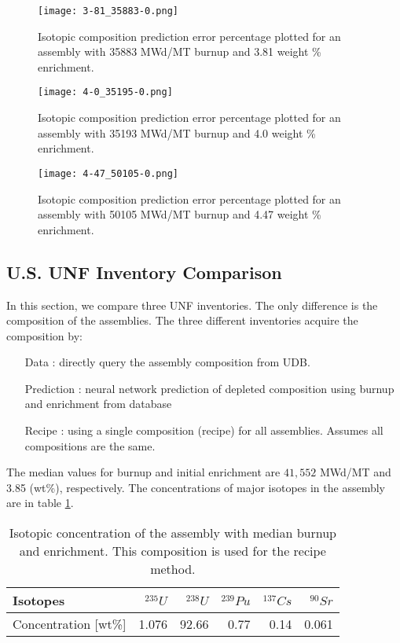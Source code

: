 \begin{figure}
    \centering
    \texttt{[image: 3-81\_35883-0.png]}
    \caption{Isotopic composition prediction error percentage
             plotted for an assembly with 
             35883 MWd/MT burnup and 3.81 weight \% enrichment.}
    \label{fig:3-81_35883-0}
\end{figure}

\begin{figure}
    \centering
    \texttt{[image: 4-0\_35195-0.png]}
    \caption{Isotopic composition prediction error percentage
             plotted for an assembly with 
             35193 MWd/MT burnup and 4.0 weight \% enrichment.}
    \label{fig:4-0_35195-0}
\end{figure}


\begin{figure}
    \centering
    \texttt{[image: 4-47\_50105-0.png]}
    \caption{Isotopic composition prediction error percentage
             plotted for an assembly with 
             50105 MWd/MT burnup and 4.47 weight \% enrichment.}
    \label{fig:4-47_50105-0}
\end{figure}

\FloatBarrier

\subsection{U.S. \gls{UNF} Inventory Comparison}

In this section, we compare three \gls{UNF} inventories.
The only difference is the composition of the
assemblies. The three different inventories acquire the composition by:

\begin{enumerate}
    \item [Data]: directly query the assembly composition from \gls{UDB}.
    \item [Prediction]: neural network prediction of depleted composition using burnup and enrichment from database
    \item [Recipe]: using a single composition (recipe) for all assemblies. Assumes all compositions are the same.
\end{enumerate}

The median values for burnup and initial enrichment are
$41,552$ MWd/MT and 3.85 (wt\%), respectively. The concentrations of major
isotopes in the assembly are in table \ref{tab:avg_assem}.


\begin{table}[h]
    \centering
    \begin{tabular}{|l|r|r|r|r|r|}
        \hline
        Isotopes & $^{235}U$ & $^{238}U$ & $^{239}Pu$ & $^{137}Cs$ & $^{90}Sr$ \\
        \hline
        Concentration [wt\%] & 1.076 & 92.66 & 0.77 & 0.14 & 0.061 \\
        \hline
    \end{tabular}
    \caption{Isotopic concentration of the assembly with median burnup and
             enrichment. This composition is used for the recipe method. 
    \label{tab:avg_assem}}
\end{table}


